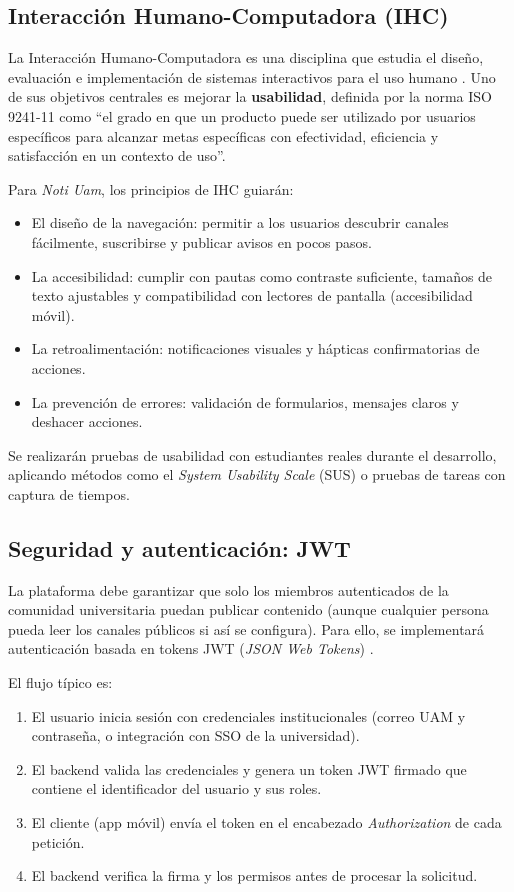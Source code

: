 \subsection{Interacción Humano-Computadora (IHC)}

La Interacción Humano-Computadora es una disciplina que estudia el diseño, evaluación e implementación de sistemas interactivos para el uso humano \cite{amexcomp2020ihc}. Uno de sus objetivos centrales es mejorar la \textbf{usabilidad}, definida por la norma ISO 9241-11 como “el grado en que un producto puede ser utilizado por usuarios específicos para alcanzar metas específicas con efectividad, eficiencia y satisfacción en un contexto de uso”.

Para \textit{Noti Uam}, los principios de IHC guiarán:

\begin{itemize}
    \item El diseño de la navegación: permitir a los usuarios descubrir canales fácilmente, suscribirse y publicar avisos en pocos pasos.
    \item La accesibilidad: cumplir con pautas como contraste suficiente, tamaños de texto ajustables y compatibilidad con lectores de pantalla (accesibilidad móvil).
    \item La retroalimentación: notificaciones visuales y hápticas confirmatorias de acciones.
    \item La prevención de errores: validación de formularios, mensajes claros y deshacer acciones.
\end{itemize}

Se realizarán pruebas de usabilidad con estudiantes reales durante el desarrollo, aplicando métodos como el \textit{System Usability Scale} (SUS) o pruebas de tareas con captura de tiempos.

\subsection{Seguridad y autenticación: JWT}

La plataforma debe garantizar que solo los miembros autenticados de la comunidad universitaria puedan publicar contenido (aunque cualquier persona pueda leer los canales públicos si así se configura). Para ello, se implementará autenticación basada en tokens JWT (\textit{JSON Web Tokens}) \cite{jwt2015rfc}.

El flujo típico es:

\begin{enumerate}
    \item El usuario inicia sesión con credenciales institucionales (correo UAM y contraseña, o integración con SSO de la universidad).
    \item El backend valida las credenciales y genera un token JWT firmado que contiene el identificador del usuario y sus roles.
    \item El cliente (app móvil) envía el token en el encabezado \textit{Authorization} de cada petición.
    \item El backend verifica la firma y los permisos antes de procesar la solicitud.
\end{enumerate}

